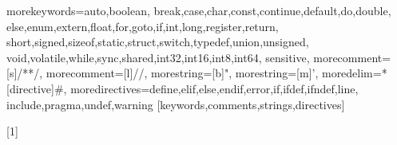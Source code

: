 

%
  {morekeywords={auto,boolean,
      break,case,char,const,continue,default,do,double,%
      else,enum,extern,float,for,goto,if,int,long,register,return,%
      short,signed,sizeof,static,struct,switch,typedef,union,unsigned,%
      void,volatile,while,sync,shared,int32,int16,int8,int64},%
  sensitive,%
  morecomment=[s]{/*}{*/},%
  morecomment=[l]//,%
  morestring=[b]",%
  morestring=[m]',%
  moredelim=*[directive]\#,%
  moredirectives={define,elif,else,endif,error,if,ifdef,ifndef,line,%
  include,pragma,undef,warning}%
}[keywords,comments,strings,directives]%


[1]{
  \mathligsoff
  \lstset{style=pseudoC}
  \lstset{#1}
}{}


